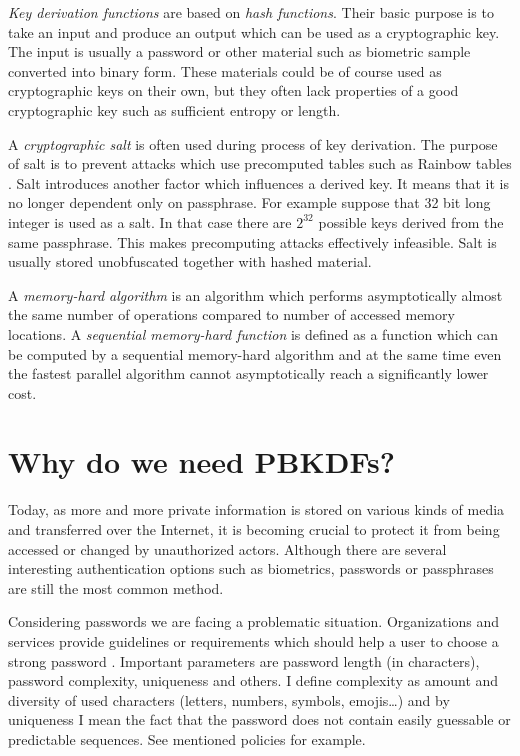 \documentclass[nolof,digital]{fithesis3}
\begin{document}
\emph{Key derivation functions} are based on \emph{hash functions}. Their basic purpose is to take an input and produce an output which can be used as a cryptographic key. The input is usually a password or other material such as biometric sample converted into binary form. These materials could be of course used as cryptographic keys on their own, but they often lack properties of a good cryptographic key such as sufficient entropy or length. 

A \emph{cryptographic salt} is often used during process of key derivation. The purpose of salt is to prevent attacks which use precomputed tables such as Rainbow tables \parencite{rainbowtables}. Salt introduces another factor which influences a derived key. It means that it is no longer dependent only on passphrase. For example suppose that 32 bit long integer is used as a salt. In that case there are \(2^{32}\) possible keys derived from the same passphrase. This makes precomputing attacks effectively infeasible. Salt is usually stored unobfuscated together with hashed material.

A \emph{memory-hard algorithm} is an algorithm which performs asymptotically almost the same number of operations compared to number of accessed memory locations. A \emph{sequential memory-hard function} is defined as a function which can be computed by a sequential memory-hard algorithm and at the same time even the fastest parallel algorithm cannot asymptotically reach a significantly lower cost.

\section{Why do we need PBKDFs?}
\label{whypbkdfs}
Today, as more and more private information is stored on various kinds of media and transferred over the Internet, it is becoming crucial to protect it from being accessed or changed by unauthorized actors. Although there are several interesting authentication options such as biometrics, passwords or passphrases are still the most common method.

Considering passwords we are facing a problematic situation. Organizations and services provide guidelines or requirements which should help a user to choose a strong password \parencites{nistpasswords}{sanspasswordguidelines}. Important parameters are password length (in characters), password complexity, uniqueness and others. I define complexity as amount and diversity of used characters (letters, numbers, symbols, emojis\dots) and by uniqueness I mean the fact that the password does not contain easily guessable or predictable sequences. See mentioned policies for example.
\end{document}

